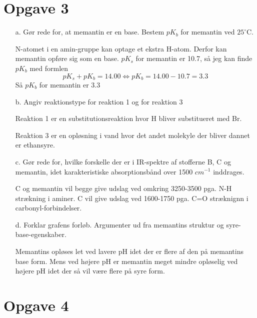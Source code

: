 \documentclass[12pt]{article}
\begin{document}
\section*{Opgave 3}

\begin{enumerate}

        \item[a.] Gør rede for, at memantin er en base. Bestem
                $pK_b$ for memantin ved $25^{\circ}$C.

                N-atomet i en amin-gruppe kan optage et ekstra H-atom. Derfor
                kan memantin opføre sig som en base. $pK_s$ for memantin er
                10.7, så jeg kan finde $pK_b$ med formlen
                $$pK_s+pK_b = 14.00 \Leftrightarrow pK_b = 14.00-10.7 = 3.3$$
                Så $pK_b$ for memantin er 3.3

        \item[b.] Angiv reaktionstype for reaktion 1 og for reaktion 3

                Reaktion 1 er en substitutionsreaktion hvor H bliver
                substitueret med Br.

                Reaktion 3 er en opløsning i vand hvor det andet molekyle
                der bliver dannet er ethansyre.

        \item[c.] Gør rede for, hvilke forskelle der er i IR-spektre af
                stofferne B, C og memantin, idet karakteristiske absorptionsbånd
                over 1500 $cm^{-1}$ inddrages.

                C og memantin vil begge give udslag ved omkring 3250-3500
                pga. N-H strækning i aminer. C vil give udslag ved 1600-1750
                pga. C=O stræknignn i carbonyl-forbindelser.

        \item[d.] Forklar grafens forløb. Argumenter ud fra memantins struktur
                og syre-base-egenskaber.

                Memantins opløses let ved lavere pH idet der er flere af den på memantins base form.
                Mens ved højere pH er memantin meget mindre opløselig ved højere pH idet der så vil være flere på syre form.

\end{enumerate}

\section*{Opgave 4}
\end{document}
